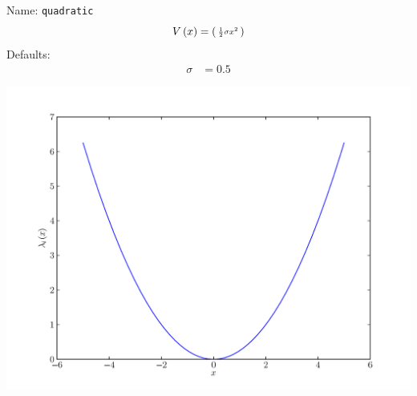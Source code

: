 \documentclass[a4paper,10pt]{report}
\begin{document}
\begin{minipage}{0.5\linewidth}
  Name:    \texttt{quadratic}
  \begin{equation*}
    V\left( x \right) = \left(\begin{smallmatrix}\frac{1}{2} \sigma x^{2}\end{smallmatrix}\right)
  \end{equation*}
  Defaults:
  \begin{align*}
    \sigma & = 0.5
  \end{align*}
\end{minipage}
\begin{minipage}{0.5\linewidth}
  \begin{center}
    \includegraphics[scale=0.25]{./fig/quadratic.pdf}
  \end{center}
\end{minipage}
\end{document}
